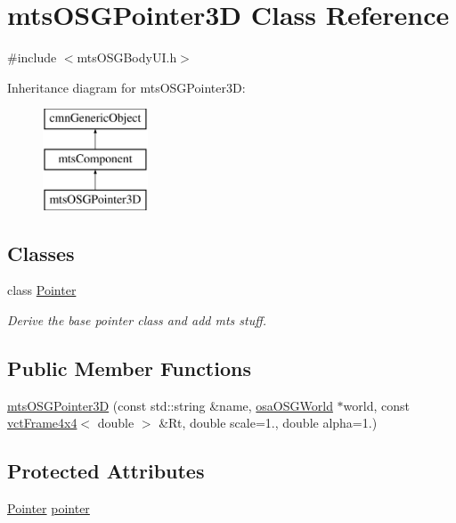 \hypertarget{classmts_o_s_g_pointer3_d}{}\section{mts\+O\+S\+G\+Pointer3\+D Class Reference}
\label{classmts_o_s_g_pointer3_d}


{\ttfamily \#include $<$mts\+O\+S\+G\+Body\+U\+I.\+h$>$}

Inheritance diagram for mts\+O\+S\+G\+Pointer3\+D\+:\begin{figure}[H]
\begin{center}
\leavevmode
\includegraphics[height=3.000000cm]{d4/d44/classmts_o_s_g_pointer3_d}
\end{center}
\end{figure}
\subsection*{Classes}
\begin{DoxyCompactItemize}
\item 
class \hyperlink{classmts_o_s_g_pointer3_d_1_1_pointer}{Pointer}
\begin{DoxyCompactList}\small\item\em Derive the base pointer class and add mts stuff. \end{DoxyCompactList}\end{DoxyCompactItemize}
\subsection*{Public Member Functions}
\begin{DoxyCompactItemize}
\item 
\hyperlink{classmts_o_s_g_pointer3_d_ade933869c35fab1caa4a5d39b17b78cd}{mts\+O\+S\+G\+Pointer3\+D} (const std\+::string \&name, \hyperlink{classosa_o_s_g_world}{osa\+O\+S\+G\+World} $\ast$world, const \hyperlink{classvct_frame4x4}{vct\+Frame4x4}$<$ double $>$ \&Rt, double scale=1., double alpha=1.)
\end{DoxyCompactItemize}
\subsection*{Protected Attributes}
\begin{DoxyCompactItemize}
\item 
\hyperlink{classmts_o_s_g_pointer3_d_1_1_pointer}{Pointer} \hyperlink{classmts_o_s_g_pointer3_d_a0c87dc19f3d51680651e6aaa86fee270}{pointer}
\end{DoxyCompactItemize}

